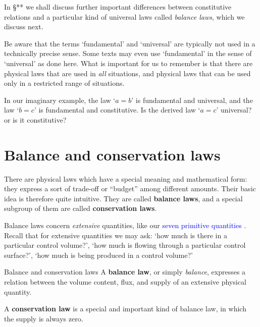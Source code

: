 \documentclass[a4paper,12pt,%
onecolumn,oneside,%
british%
]{memoir}
\renewcommand*{\|}[1][]{\nonscript\:#1\vert\nonscript\:\mathopen{}}
\newcommand*{\sect}{\S}%
\renewcommand*{\autoref}[3][\sect\,\ref]{\textcolor{blue}{#3}
\raisebox{0.6ex}{\color{blue}\miniscule%
\faIcon{angle-right}%
\;#1{#2}\;p.\,\pageref{#2}}}
\begin{document}
\medskip

In \sect*** we shall discuss further important differences between constitutive relations and a particular kind of universal laws called \emph{balance laws}, which we discuss next.


\begin{warning}
  Be aware that the terms \enquote*{fundamental} and \enquote*{universal} are typically not used in a technically precise sense. Some texts may even use \enquote*{fundamental} in the sense of \enquote*{universal} as done here. What is important for us to remember is that there are physical laws that are used in \emph{all} situations, and physical laws that can be used only in a restricted range of situations.
\end{warning}

\begin{exercise}
  In our imaginary example, the law \enquote*{$a=b$} is fundamental and universal, and the law \enquote*{$b=c$} is fundamental and constitutive. Is the derived law \enquote*{$a=c$} universal? or is it constitutive?
\end{exercise}

\section{Balance and conservation laws}
\label{sec:balance_intro}

There are physical laws which have a special meaning and mathematical form: they express a sort of trade-off or \enquote{budget} among different amounts. Their basic idea is therefore quite intuitive. They are called \textbf{balance laws}, and a special subgroup of them are called \textbf{conservation laws}.

Balance laws concern \emph{extensive} quantities, like our \autoref{sec:stuff}{seven primitive quantities}. Recall that for extensive quantities we may ask: \enquote*{how much is there in a particular control volume?}, \enquote*{how much is flowing through a particular control surface?}, \enquote*{how much is being produced in a control volume?}
\begin{definition}{Balance and conservation laws}
  A \textbf{balance law}, or simply \emph{balance}, expresses a relation between the volume content, flux, and supply of an extensive physical quantity.

  \smallskip

  A \textbf{conservation law} is a special and important kind of balance law, in which the supply is always zero.
\end{definition}
\end{document}
